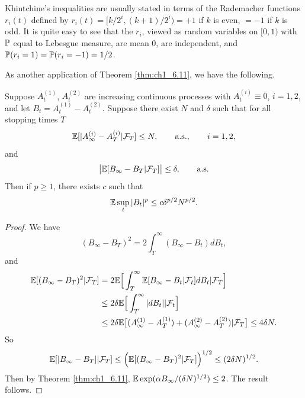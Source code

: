
Khintchine's inequalities are usually stated in terms of the Rademacher functions $r_i(t)$ defined by $r_i(t) = [k/2^i, (k+1)/2^i) = +1$ if $k$ is even, $= -1$ if $k$ is odd. It is quite easy to see that the $r_i$, viewed as random variables on $[0,1)$ with $\P$ equal to Lebesgue measure, are mean $0$, are independent, and $\P(r_i = 1) = \P(r_i = -1) = 1/2$.


As another application of Theorem \ref{thm:ch1_6.11}, we have the following.

\begin{proposition}\label{prop:ch1_6.14}
Suppose $A_t^{(1)}$, $A_t^{(2)}$ are increasing continuous processes with $A_t^{(i)} \equiv 0$, $i = 1,2$, and let $B_t = A_t^{(1)} - A_t^{(2)}$. Suppose there exist $N$ and $\delta$ such that for all stopping times $T$
\begin{equation}\label{eq:ch1_6.28}
    \E[|A_\infty^{(i)} - A_T^{(i)}\mid \FC_T] \leq N, \qquad \textnormal{a.s.}, \qquad i = 1,2,
\end{equation}
and
\mpagebreak
\begin{equation}\label{eq:ch1_6.29}
    \big|\E[B_\infty - B_T\mid \FC_T]\big| \leq \delta, \qquad \textnormal{a.s.}
\end{equation}
Then if $p \geq 1$, there exists $c$ such that
\[
    \E \sup_t |B_t|^p \leq c\delta^{p/2}N^{p/2}.
\]
\end{proposition}

\begin{proof}
We have
\[
    (B_\infty - B_T)^2 = 2\int_T^\infty (B_\infty - B_t)dB_t,
\]
and
\begin{align*}
    \E[(B_\infty - B_T)^2\mid \FC_T] &= 2\E\Big[\int_T^\infty \E[B_\infty - B_t|\FC_t]dB_t\mid \FC_T\Big] \\
    &\leq 2\delta\E\Big[\int_T^\infty |dB_t|\mid \FC_t\Big] \\
    &\leq 2\delta\E\big[(A_\infty^{(1)} - A_T^{(1)}) + (A_\infty^{(2)} - A_T^{(2)})\mid \FC_T\big] \leq 4\delta N.
\end{align*}
So
\[
    \E[|B_\infty - B_T|\mid \FC_T] \leq \Big(\E[(B_\infty - B_T)^2\mid \FC_T]\Big)^{1/2} \leq (2\delta N)^{1/2}.
\]
Then by Theorem \ref{thm:ch1_6.11}, $\E \exp(\alpha B_\infty/(\delta N)^{1/2}) \leq 2$. The result follows.
\end{proof}

